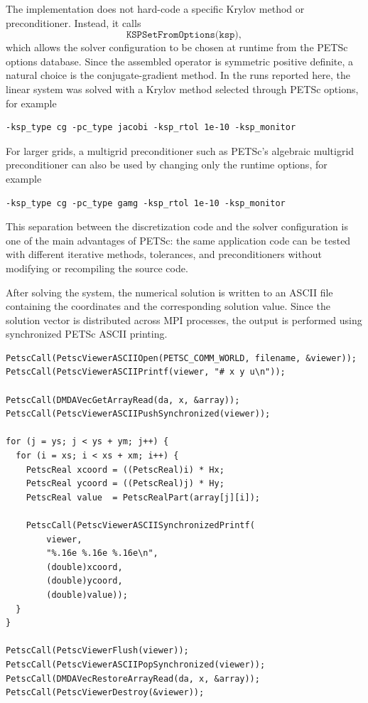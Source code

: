 \documentclass[unicode,10pt,a4paper,oneside,numbers=endperiod,openany]{scrartcl}
\begin{document}
The implementation does not hard-code a specific Krylov method or
preconditioner. Instead, it calls
\[
    \texttt{KSPSetFromOptions(ksp)},
\]
which allows the solver configuration to be chosen at runtime from the PETSc
options database. Since the assembled operator is symmetric positive definite,
a natural choice is the conjugate-gradient method. In the runs reported here,
the linear system was solved with a Krylov method selected through PETSc options,
for example
\begin{lstlisting}[style=grayverbatim, caption={Example PETSc solver options for the Poisson problem}, label={lst:petsc_solver_options}]
-ksp_type cg -pc_type jacobi -ksp_rtol 1e-10 -ksp_monitor
\end{lstlisting}
For larger grids, a multigrid preconditioner such as PETSc's algebraic multigrid
preconditioner can also be used by changing only the runtime options, for
example
\begin{lstlisting}[style=grayverbatim, caption={Example PETSc options using algebraic multigrid}, label={lst:petsc_gamg_options}]
-ksp_type cg -pc_type gamg -ksp_rtol 1e-10 -ksp_monitor
\end{lstlisting}
This separation between the discretization code and the solver configuration is
one of the main advantages of PETSc: the same application code can be tested
with different iterative methods, tolerances, and preconditioners without
modifying or recompiling the source code.

After solving the system, the numerical solution is written to an ASCII file
containing the coordinates and the corresponding solution value. Since the
solution vector is distributed across MPI processes, the output is performed
using synchronized PETSc ASCII printing.

\begin{lstlisting}[style=grayverbatim, caption={Writing the distributed solution to file}, label={lst:write_solution}]
PetscCall(PetscViewerASCIIOpen(PETSC_COMM_WORLD, filename, &viewer));
PetscCall(PetscViewerASCIIPrintf(viewer, "# x y u\n"));

PetscCall(DMDAVecGetArrayRead(da, x, &array));
PetscCall(PetscViewerASCIIPushSynchronized(viewer));

for (j = ys; j < ys + ym; j++) {
  for (i = xs; i < xs + xm; i++) {
    PetscReal xcoord = ((PetscReal)i) * Hx;
    PetscReal ycoord = ((PetscReal)j) * Hy;
    PetscReal value  = PetscRealPart(array[j][i]);

    PetscCall(PetscViewerASCIISynchronizedPrintf(
        viewer,
        "%.16e %.16e %.16e\n",
        (double)xcoord,
        (double)ycoord,
        (double)value));
  }
}

PetscCall(PetscViewerFlush(viewer));
PetscCall(PetscViewerASCIIPopSynchronized(viewer));
PetscCall(DMDAVecRestoreArrayRead(da, x, &array));
PetscCall(PetscViewerDestroy(&viewer));
\end{lstlisting}
\end{document}
